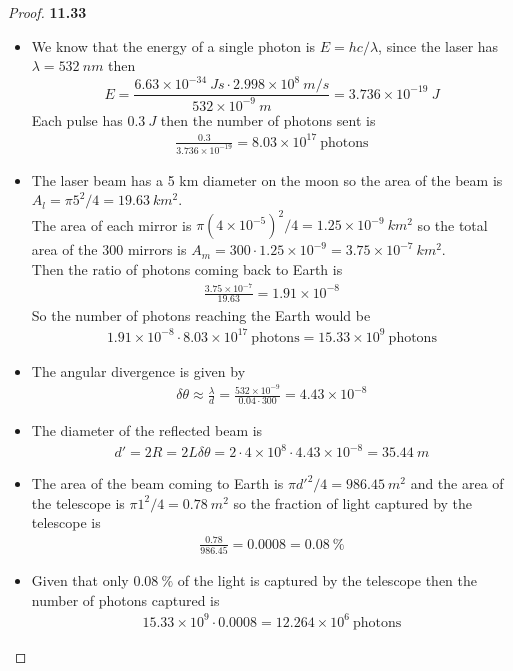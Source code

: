 \documentclass[11pt]{article}
\newcommand{\sci}[1]{\times 10^{#1}}
\theoremstyle{definition}
\begin{document}
\cleardoublepage
\begin{proof}{\textbf{11.33}}
\begin{itemize}
\item [\textbf{(a)}] We know that the energy of a single photon is
$E = hc/\lambda$, since the laser has $\lambda = 532~nm$ then
$$E = \frac{6.63\sci{-34}~Js\cdot 2.998\sci{8}~m/s}{532\sci{-9}~m}
= 3.736\sci{-19}~J $$
Each pulse has $0.3~J$ then the number of photons sent is
\begin{align*}
    \frac{0.3}{3.736\sci{-19}} = 8.03\sci{17}~\text{photons}
\end{align*}
\item [\textbf{(b)}] The laser beam has a 5 km diameter on the moon so the 
area of the beam is $A_l = \pi 5^2/4 = 19.63~km^2$.\\
The area of each mirror is $\pi (4\sci{-5})^2/4 = 1.25\sci{-9}~km^2$
so the total area of the 300 mirrors is
$A_m = 300 \cdot 1.25\sci{-9} = 3.75\sci{-7}~km^2$.\\
Then the ratio of photons coming back to Earth is
\begin{align*}
    \frac{3.75\sci{-7}}{19.63} = 1.91\sci{-8}
\end{align*}
So the number of photons reaching the Earth would be 
\begin{align*}
    1.91\sci{-8} \cdot 8.03\sci{17}~\text{photons}
    =  15.33\sci{9}~\text{photons}
\end{align*}
\item [\textbf{(c)}] The angular divergence is given by
\begin{align*}
    \delta\theta \approx \frac{\lambda}{d}
    = \frac{532\sci{-9}}{0.04 \cdot 300}
    = 4.43\sci{-8}
\end{align*}
\item [\textbf{(d)}] The diameter of the reflected beam is
\begin{align*}
    d' = 2R = 2L \delta\theta = 2 \cdot 4\sci{8} \cdot 4.43\sci{-8}
    = 35.44~m
\end{align*}
\item [\textbf{(e)}] The area of the beam coming to Earth is 
$\pi d'^2/4 = 986.45~m^2$ and the area of the telescope is
$\pi 1^2/4 = 0.78~m^2$ so the fraction of light captured by the telescope is
\begin{align*}
    \frac{0.78}{986.45} = 0.0008 = 0.08~\%
\end{align*}
\item [\textbf{(f)}] Given that only $0.08~\%$ of the light is captured by the
telescope then the number of photons captured is
\begin{align*}
    15.33\sci{9} \cdot 0.0008 = 12.264\sci{6}~\text{photons}
\end{align*}

\end{itemize}
\end{proof}
\end{document}
